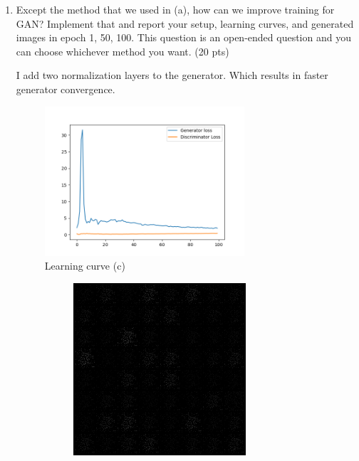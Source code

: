 \documentclass[a4paper]{article}
\theoremstyle{definition}
\newenvironment{soln}{
	\leavevmode\color{blue}\ignorespaces
}{}
\begin{document}
\begin{enumerate} [label=(\alph*)]
				\pagebreak
	\item Except the method that we used in (a), how can we improve training for GAN? Implement that and report your setup, learning curves, and generated images in epoch 1, 50, 100.
	      This question is an open-ended question and you can choose whichever method you want.
	      \hfill (20 pts)

	      \begin{soln}
					I add two normalization layers to the generator. Which results in faster generator convergence.

		      \begin{figure}[H]
			      \centering
			      \includegraphics[width=0.7\textwidth]{img/q1_3/loss.png}
			      \caption*{Learning curve (c)}
		      \end{figure}
		      \begin{figure}[H]
			      \centering
			      \begin{subfigure}[b]{0.3\textwidth}
				      \centering
				      \includegraphics[width=\textwidth]{img/q1_3/gen_img1.png}

\end{subfigure}
\end{figure}
\end{soln}
\end{enumerate}
\end{document}
